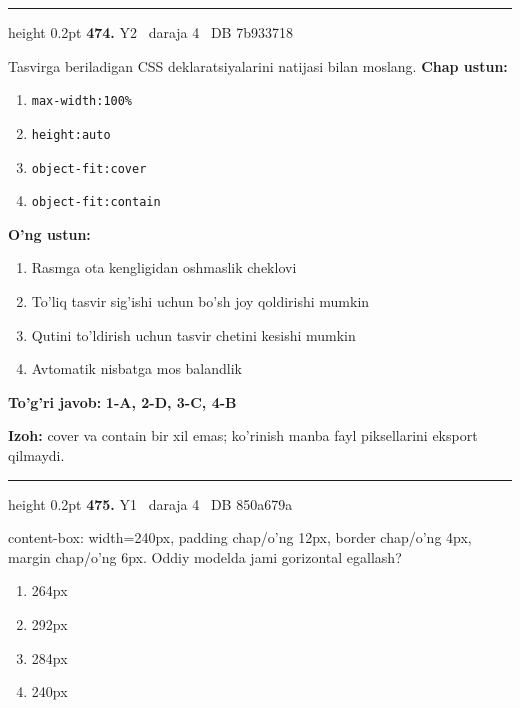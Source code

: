 \documentclass[10pt,a4paper,oneside]{article}
\begin{document}
\vspace{2mm}\hrule height 0.2pt \vspace{4mm}
\hypertarget{q474}{\textbf{\color{ink}474.}}  {\color{muted}\scriptsize Y2 \textbullet\ daraja 4 \textbullet\ DB 7b933718}
\par
Tasvirga beriladigan CSS deklaratsiyalarini natijasi bilan moslang.
\textbf{\footnotesize Chap ustun:}
\begin{enumerate}[label=\arabic*),leftmargin=9mm]
\item \texttt{max-width:100\%}
\item \texttt{height:auto}
\item \texttt{object-fit:cover}
\item \texttt{object-fit:contain}
\end{enumerate}
\textbf{\footnotesize O'ng ustun:}
\begin{enumerate}[label=\Alph*),leftmargin=9mm]
\item Rasmga ota kengligidan oshmaslik cheklovi
\item To'liq tasvir sig'ishi uchun bo'sh joy qoldirishi mumkin
\item Qutini to'ldirish uchun tasvir chetini kesishi mumkin
\item Avtomatik nisbatga mos balandlik
\end{enumerate}
\begin{tcolorbox}[enhanced,breakable,colback=teal!4,colframe=teal!45!black,boxrule=0.45pt,arc=1.2mm,left=2.8mm,right=2.8mm,top=2mm,bottom=2mm,before skip=2mm,after skip=2mm]
\textbf{\color{teal}To'g'ri javob:} \textbf{1-A, 2-D, 3-C, 4-B}
\par\smallskip
\textbf{Izoh:} cover va contain bir xil emas; ko'rinish manba fayl piksellarini eksport qilmaydi.
\end{tcolorbox}
\vspace{2mm}\hrule height 0.2pt \vspace{4mm}
\hypertarget{q475}{\textbf{\color{ink}475.}}  {\color{muted}\scriptsize Y1 \textbullet\ daraja 4 \textbullet\ DB 850a679a}
\par
content-box: width=240px, padding chap/o'ng 12px, border chap/o'ng 4px, margin chap/o'ng 6px. Oddiy modelda jami gorizontal egallash?
\begin{enumerate}[label=\Alph*),leftmargin=9mm]
\item 264px
\item 292px
\item 284px
\item 240px
\end{enumerate}
\end{document}

